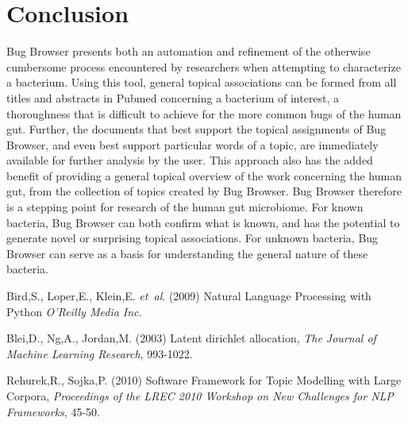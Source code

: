 \documentclass{bioinfo}
\begin{document}
\section{Conclusion}
Bug Browser presents both an automation and refinement of the otherwise cumbersome process encountered by researchers when attempting to characterize a bacterium. Using this tool, general topical associations can be formed from all titles and abstracts in Pubmed concerning a bacterium of interest, a thoroughness that is difficult to achieve for the more common bugs of the human gut. Further, the documents that best support the topical assignments of Bug Browser, and even best support particular words of a topic, are immediately available for further analysis by the user. This approach also has the added benefit of providing a general topical overview of the work concerning the human gut, from the collection of topics created by Bug Browser. Bug Browser therefore is a stepping point for research of the human gut microbiome. For known bacteria, Bug Browser can both confirm what is known, and has the potential to generate novel or surprising topical associations. For unknown bacteria, Bug Browser can serve as a basis for understanding the general nature of these bacteria.



\begin{thebibliography}{}
Bird,S., Loper,E., Klein,E.  \textit{et~al}. (2009) Natural Language Processing with Python \textit{O'Reilly Media Inc.}

Blei,D., Ng,A., Jordan,M. (2003) Latent dirichlet allocation, {\it The Journal of Machine Learning Research}, 993-1022.

Rehurek,R., Sojka,P. (2010) Software Framework for Topic Modelling with Large Corpora, {\it Proceedings of the LREC 2010 Workshop on New Challenges for NLP Frameworks}, 45-50.

\end{thebibliography}
\end{document}
